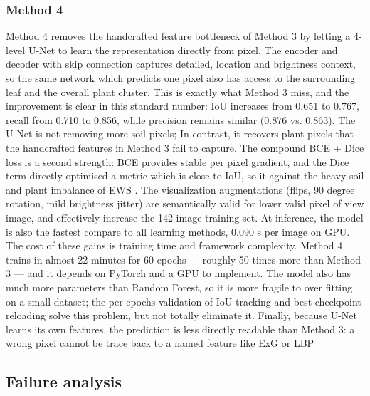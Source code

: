 \documentclass[conference]{IEEEtran}
\begin{document}
\subsubsection{Method 4}
Method 4 removes the handcrafted feature bottleneck of Method 3 by letting a 4-level U-Net to learn the representation directly from pixel. The encoder and decoder with skip connection captures detailed, location and brightness context, so the same network which predicts one pixel also has access to the surrounding leaf and the overall plant cluster. This is exactly what Method 3 miss, and the improvement is clear in this standard number: IoU increases from 0.651 to 0.767, recall from 0.710 to 0.856, while precision remains similar (0.876 vs. 0.863). The U-Net is not removing more soil pixels; In contrast, it recovers plant pixels that the handcrafted features in Method 3 fail to capture. The compound BCE + Dice loss is a second strength: BCE provides stable per pixel gradient, and the Dice term directly optimised a metric which is close to IoU, so it against the heavy soil and plant imbalance of EWS \cite{vnet}. The visualization augmentations (flips, 90 degree rotation, mild brightness jitter) are semantically valid for lower valid pixel of view image, and effectively increase the 142-image training set. At inference, the model is also the fastest compare to all learning methods, 0.090 s per image on GPU.
The cost of these gains is training time and framework complexity. Method 4 trains in almost 22 minutes for 60 epochs — roughly 50 times more than Method 3 — and it depends on PyTorch and a GPU to implement. The model also has much more parameters than Random Forest, so it is more fragile to over fitting on a small dataset; the per epochs validation of IoU tracking and best checkpoint reloading solve this problem, but not totally eliminate it. Finally, because U-Net learns its own features, the prediction is less directly readable than Method 3: a wrong pixel cannot be trace back to a named feature like ExG or LBP

\subsection{Failure analysis }
\end{document}
